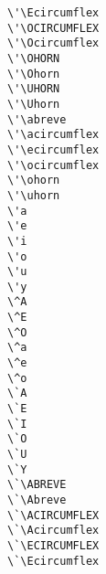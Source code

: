 \begin{multicols}{2}
\X{\'\Ecircumflex} \verb|\'\Ecircumflex| \\
\X{\'\OCIRCUMFLEX} \verb|\'\OCIRCUMFLEX| \\
\X{\'\Ocircumflex} \verb|\'\Ocircumflex| \\
\X{\'\OHORN} \verb|\'\OHORN| \\
\X{\'\Ohorn} \verb|\'\Ohorn| \\
\X{\'\UHORN} \verb|\'\UHORN| \\
\X{\'\Uhorn} \verb|\'\Uhorn| \\
\X{\'\abreve} \verb|\'\abreve| \\
\X{\'\acircumflex} \verb|\'\acircumflex| \\
\X{\'\ecircumflex} \verb|\'\ecircumflex| \\
\X{\'\ocircumflex} \verb|\'\ocircumflex| \\
\X{\'\ohorn} \verb|\'\ohorn| \\
\X{\'\uhorn} \verb|\'\uhorn| \\
 \verb|\'a| \\
 \verb|\'e| \\
 \verb|\'i| \\
 \verb|\'o| \\
 \verb|\'u| \\
 \verb|\'y| \\
 \verb|\^A| \\
 \verb|\^E| \\
 \verb|\^O| \\
 \verb|\^a| \\
 \verb|\^e| \\
 \verb|\^o| \\
 \verb|\`A| \\
 \verb|\`E| \\
 \verb|\`I| \\
 \verb|\`O| \\
 \verb|\`U| \\
 \verb|\`Y| \\
\X{\`\ABREVE} \verb|\`\ABREVE| \\
\X{\`\Abreve} \verb|\`\Abreve| \\
\X{\`\ACIRCUMFLEX} \verb|\`\ACIRCUMFLEX| \\
\X{\`\Acircumflex} \verb|\`\Acircumflex| \\
\X{\`\ECIRCUMFLEX} \verb|\`\ECIRCUMFLEX| \\
\X{\`\Ecircumflex} \verb|\`\Ecircumflex| \\

\end{multicols}
